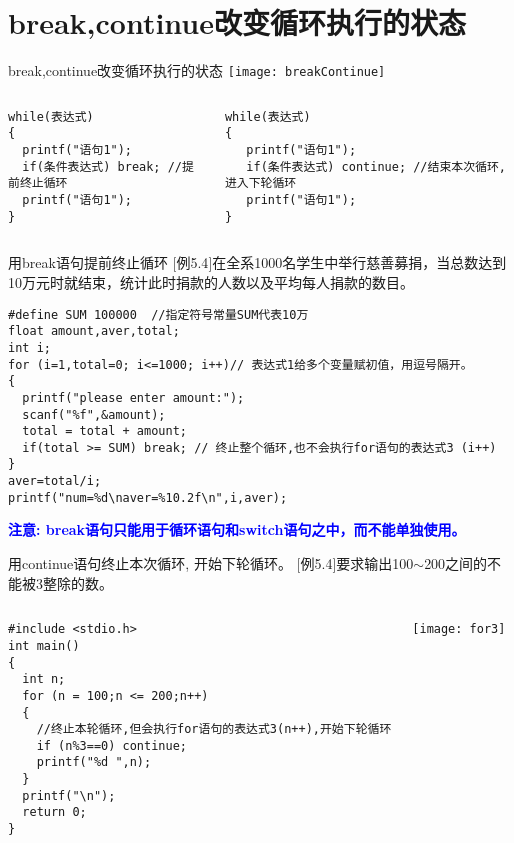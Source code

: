 \section{break,continue改变循环执行的状态}

\begin{frame}{break,continue改变循环执行的状态}
\centering
\texttt{[image: breakContinue]}
\begin{columns}[T]
\begin{lstlisting}
while(表达式)
{
  printf("语句1");
  if(条件表达式) break; //提前终止循环
  printf("语句1");
}
\end{lstlisting}
\begin{lstlisting}[frame=leftline]
while(表达式)
{
   printf("语句1");
   if(条件表达式) continue; //结束本次循环, 进入下轮循环
   printf("语句1");
}
\end{lstlisting}
\end{columns}
\end{frame}

\begin{frame}{用break语句提前终止循环}
$[$例5.4$]$在全系1000名学生中举行慈善募捐，当总数达到10万元时就结束，统计此时捐款的人数以及平均每人捐款的数目。
\begin{lstlisting}
#define SUM 100000  //指定符号常量SUM代表10万
float amount,aver,total; 
int i;
for (i=1,total=0; i<=1000; i++)// 表达式1给多个变量赋初值，用逗号隔开。
{
  printf("please enter amount:");
  scanf("%f",&amount);
  total = total + amount; 
  if(total >= SUM) break; // 终止整个循环,也不会执行for语句的表达式3 (i++)
}
aver=total/i;
printf("num=%d\naver=%10.2f\n",i,aver); 
\end{lstlisting}
\textbf{\textcolor{blue}{注意: break语句只能用于循环语句和switch语句之中，而不能单独使用。}}
\end{frame}

\begin{frame}{用continue语句终止本次循环, 开始下轮循环。}
$[$例5.4$]$要求输出100$\sim$200之间的不能被3整除的数。
\vspace{-0.3cm}
\begin{columns}
\begin{lstlisting}
#include <stdio.h>
int main()
{
  int n;
  for (n = 100;n <= 200;n++)
  {
    //终止本轮循环,但会执行for语句的表达式3(n++),开始下轮循环
    if (n%3==0) continue;
    printf("%d ",n);
  }
  printf("\n");
  return 0;
} 
\end{lstlisting}
\texttt{[image: for3]}
\end{columns}
\end{frame}

